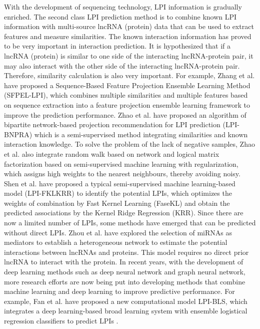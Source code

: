 \documentclass[fleqn,10pt]{wlscirep}
\begin{document}
With the development of sequencing technology, LPI information is gradually enriched. The second class LPI prediction method is to combine known LPI information with multi-source lncRNA (protein) data that can be used to extract features and measure similarities. The known interaction information has proved to be very important in interaction prediction. It is hypothesized that if a lncRNA (protein) is similar to one side of the interacting lncRNA-protein pair, it may also interact with the other side of the interacting lncRNA-protein pair. Therefore, similarity calculation is also very important. For example, Zhang et al. have proposed a Sequence-Based Feature Projection Ensemble Learning Method (SFPEL-LPI), which combines multiple similarities and multiple features based on sequence extraction into a feature projection ensemble learning framework to improve the prediction performance\cite{Zhang2018SFPEL-LPI:Interactions}.
Zhao et al. have proposed an algorithm of bipartite network-based projection recommendation for LPI prediction (LPI-BNPRA) which is a semi-supervised method integrating similarities and known interaction knowledge\cite{zhao2018bipartite}. To solve the problem of the lack of negative samples, Zhao et al. also integrate random walk based on network and logical matrix factorization based on semi-supervised machine learning with regularization, which assigns high weights to the nearest neighbours, thereby avoiding noisy\cite{Zhao2018}. Shen et al. have proposed a typical semi-supervised machine learning-based model (LPI-FKLKRR) to identify the potential LPIs, which optimizes the weights of combination by Fast Kernel Learning (FaseKL) and obtain the predicted associations by the Kernel Ridge Regression (KRR)\cite{Shen2019}. Since there are now a limited number of LPIs, some methods have emerged that can be predicted without direct LPIs. Zhou et al. have explored the selection of miRNAs as mediators to establish a heterogeneous network to estimate the potential interactions between lncRNAs and proteins. This model requires no direct prior lncRNA to interact with the protein\cite{Zhou2020PredictingModel}. In recent years, with the development of deep learning methods such as deep neural network and graph neural network, more research efforts are now being put into developing methods that combine machine learning and deep learning to improve predictive performance. For example, Fan et al. have proposed a new computational model LPI-BLS, which integrates a deep learning-based broad learning system with ensemble logistical regression classifiers to predict LPIs \cite{Fan2019LPI-BLS:Classifier}.
\end{document}
